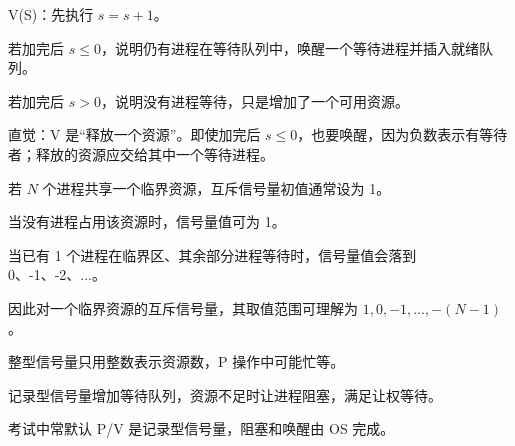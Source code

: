 \begin{points}
  \item V(S)：先执行 $s=s+1$。
  \item 若加完后 $s\le 0$，说明仍有进程在等待队列中，唤醒一个等待进程并插入就绪队列。
  \item 若加完后 $s>0$，说明没有进程等待，只是增加了一个可用资源。
  \item 直觉：V 是“释放一个资源”。即使加完后 $s\le 0$，也要唤醒，因为负数表示有等待者；释放的资源应交给其中一个等待进程。
\end{points}


\begin{points}
  \item 若 $N$ 个进程共享一个临界资源，互斥信号量初值通常设为 1。
  \item 当没有进程占用该资源时，信号量值可为 1。
  \item 当已有 1 个进程在临界区、其余部分进程等待时，信号量值会落到 0、-1、-2、...。
  \item 因此对一个临界资源的互斥信号量，其取值范围可理解为 $1,0,-1,\dots,-(N-1)$。
\end{points}

\begin{points}
  \item 整型信号量只用整数表示资源数，P 操作中可能忙等。
  \item 记录型信号量增加等待队列，资源不足时让进程阻塞，满足让权等待。
  \item 考试中常默认 P/V 是记录型信号量，阻塞和唤醒由 OS 完成。
\end{points}


